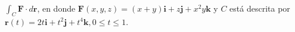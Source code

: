 \item $\int_C \mathbf{F} \cdot d\mathbf{r}$, en donde $\mathbf{F}(x, y, z) = (x + y)\mathbf{i} + z\mathbf{j} + x^2y\mathbf{k}$ y $C$ está descrita por $\mathbf{r}(t) = 2t\mathbf{i} + t^2\mathbf{j} + t^4\mathbf{k}, 0 \le t \le 1$.
